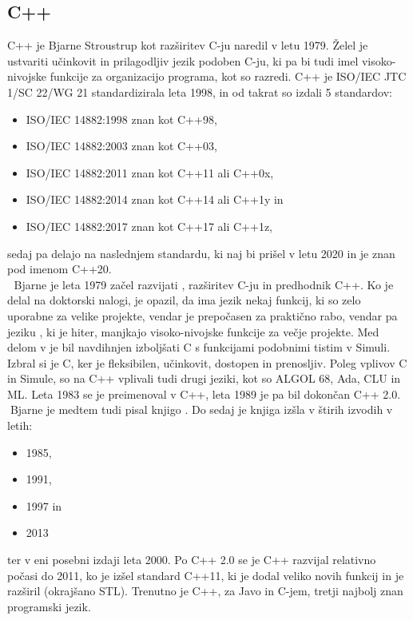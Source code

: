 \documentclass[12pt,titlepage]{report}
\newcommand{\wdot}{\textcolor{white}{.}}
\newcommand{\odstavek}{\wdot \\ \wdot \qquad}
\begin{document}
		\subsection{C++}			
			C++ je Bjarne Stroustrup kot razširitev C-ju naredil v letu 1979.
			Želel je ustvariti učinkovit in prilagodljiv jezik podoben C-ju, ki pa bi tudi imel visoko-nivojske funkcije za organizacijo programa, kot so razredi.
			C++ je ISO/IEC JTC 1/SC 22/WG 21 standardizirala leta 1998, in od takrat so izdali 5 standardov:\cite{cpp_wiki}
			\begin{itemize}
				\item ISO/IEC 14882:1998 znan kot C++98,
				\item ISO/IEC 14882:2003 znan kot C++03,
				\item ISO/IEC 14882:2011 znan kot C++11 ali C++0x,
				\item ISO/IEC 14882:2014 znan kot C++14 ali C++1y in
				\item ISO/IEC 14882:2017 znan kot C++17 ali C++1z,
			\end{itemize}
			sedaj pa delajo na naslednjem standardu, ki naj bi prišel v letu 2020 in je znan pod imenom C++20.
			\odstavek
			Bjarne je leta 1979 začel razvijati , razširitev C-ju in predhodnik C++.
			Ko je delal na doktorski nalogi, je opazil, da ima jezik  nekaj funkcij, ki so zelo uporabne za velike projekte, vendar je prepočasen za praktično rabo, vendar pa jeziku , ki je hiter, manjkajo visoko-nivojske funkcije za večje projekte.
			Med delom v  je bil navdihnjen izboljšati C s funkcijami podobnimi tistim v Simuli.
			Izbral si je C, ker je fleksibilen, učinkovit, dostopen in prenosljiv.
			Poleg vplivov C in Simule, so na C++ vplivali tudi drugi jeziki, kot so ALGOL 68, Ada, CLU in ML.
			Leta 1983 se je  preimenoval v C++, leta 1989 je pa bil dokončan C++ 2.0.
			\odstavek Bjarne je medtem tudi pisal knjigo .
			Do sedaj je knjiga izšla v štirih izvodih v letih: \cite{the_cpp_programming_language_wiki}
			\begin{itemize}
				\item 1985,
				\item 1991,
				\item 1997 in
				\item 2013
			\end{itemize}
			ter v eni posebni izdaji leta 2000.
			Po C++ 2.0 se je C++ razvijal relativno počasi do 2011, ko je izšel standard C++11, ki je dodal veliko novih funkcij in je razširil  (okrajšano STL).
			Trenutno je C++, za Javo in C-jem, tretji najbolj znan programski jezik.~\cite{tiobe}
\end{document}
